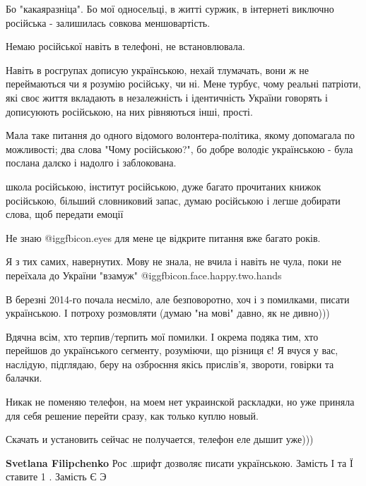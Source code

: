 \begin{itemize}

Бо "какаяразніца". Бо мої односельці, в житті суржик, в інтернеті виключно
російська - залишилась совкова меншовартість.

Немаю російської навіть в телефоні, не встановлювала.

Навіть в росгрупах дописую українською, нехай тлумачать, вони ж не переймаються
чи я розумію російську, чи ні. Мене турбує, чому реальні патріоти, які своє
життя вкладають в незалежність і ідентичність України говорять і дописуюють
російською, на них рівняються інші, прості.

Мала таке питання до одного відомого волонтера-політика, якому допомагала по
можливості; два слова "Чому російською?", бо добре володіє українською - була
послана далєко і надолго і заблокована.


школа російською, інститут російською, дуже багато прочитаних книжок
російською, більший словниковий запас, думаю російською і легше добирати слова,
щоб передати емоції


Не знаю  @igg{fbicon.eyes}  для мене це відкрите питання вже багато років.

Я з тих самих, навернутих. Мову не знала, не вчила і навіть не чула, поки не
переїхала до України "взамуж"  @igg{fbicon.face.happy.two.hands} 

В березні 2014-го почала несміло, але безповоротно, хоч і з помилками, писати
українською. І потроху розмовляти (думаю "на мові" давно, як не дивно)))

Вдячна всім, хто терпив/терпить мої помилки. І окрема подяка тим, хто перейшов
до українського сегменту, розуміючи, що різниця є! Я вчуся у вас, наслідую,
підглядаю, беру на озброєння якісь прислів'я, звороти, говірки та балачки.


Никак не поменяю телефон, на моем нет украинской раскладки, но уже приняла для
себя решение перейти сразу, как только куплю новый.

Скачать и установить сейчас не получается, телефон еле дышит уже)))

\begin{itemize} %
\textbf{Svetlana Filipchenko}
Рос .шрифт дозволяє писати українською. Замість І та Ї ставите 1 . Замість Є Э
\end{itemize} %


\end{itemize}

